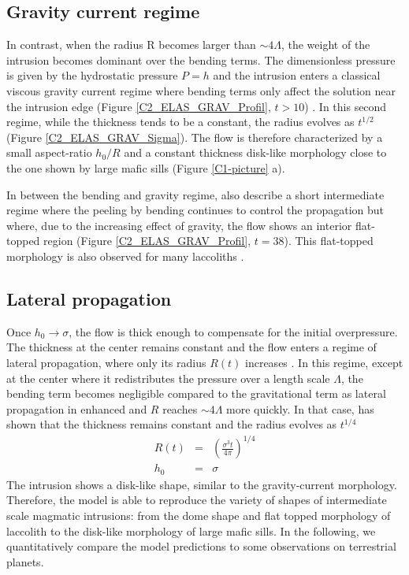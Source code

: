 \subsection{Gravity current regime}
\label{C2-sec:grav-curr-regime}

In contrast,  when the radius  R becomes larger than  $\sim 4\Lambda$,
the weight of  the intrusion becomes dominant over  the bending terms.
The  dimensionless  pressure  is  given by  the  hydrostatic  pressure
$P = h$  and the intrusion enters a classical  viscous gravity current
regime where bending terms only affect the solution near the intrusion
edge         (Figure        \ref{C2_ELAS_GRAV_Profil},         $t>10$)
\citep{Huppert:1982a,Michaut:2011kg,Lister:2013ia}.   In  this  second
regime, while the thickness tends to be a constant, the radius evolves
as $t^{1/2}$ (Figure \ref{C2_ELAS_GRAV_Sigma}).  The flow is therefore
characterized by a small aspect-ratio $h_0/R$ and a constant thickness
disk-like  morphology close  to the  one  shown by  large mafic  sills
(Figure \ref{C1-picture} a).

In between the bending  and gravity regime, \citet{Lister:2013ia} also
describe  a short  intermediate regime  where the  peeling by  bending
continues to control the propagation  but where, due to the increasing
effect  of gravity,  the  flow shows  an  interior flat-topped  region
(Figure   \ref{C2_ELAS_GRAV_Profil},    $t=38$).    This   flat-topped
morphology     is     also     observed    for     many     laccoliths
\citep{Koch:1981if,Bunger:2011cb}.

\subsection{Lateral propagation}
\label{C2-sec:lateral-propagation}

Once $h_0\rightarrow \sigma$,  the flow is thick  enough to compensate
for  the initial  overpressure. The  thickness at  the center  remains
constant and  the flow enters  a regime of lateral  propagation, where
only  its radius  $R(t)$  increases  \citep{Michaut:2011kg}.  In  this
regime, except at the center  where it redistributes the pressure over
a length scale $\Lambda$, the bending term becomes negligible compared
to the gravitational  term as lateral propagation in  enhanced and $R$
reaches    $\sim   4\Lambda$    more   quickly.     In   that    case,
\citet{Michaut:2011kg} has  shown that the thickness  remains constant
and the radius evolves as $t^{1/4}$
\begin{eqnarray}
  R(t) &=& \left(\frac{\sigma^3 t}{4\pi}\right)^{1/4}\label{C2-Scaling-R-Propa}\\
  h_0 &=& \sigma\label{C2-Scaling-H-Propa}
\end{eqnarray} 
The intrusion shows a disk-like  shape, similar to the gravity-current
morphology. Therefore, the  model is able to reproduce  the variety of
shapes of intermediate scale magmatic  intrusions: from the dome shape
and flat topped morphology of laccolith to the disk-like morphology of
large mafic  sills.  In the  following, we quantitatively  compare the
model predictions to some observations on terrestrial planets.


